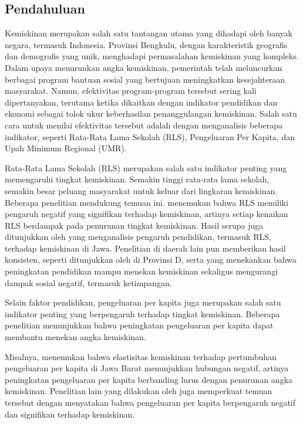 \documentclass[12pt,a4paper]{article}
\begin{document}
\begin{multicols}{2}
\section{Pendahuluan}

Kemiskinan merupakan salah satu tantangan utama yang dihadapi oleh banyak negara, termasuk Indonesia. Provinsi Bengkulu, dengan karakteristik geografis dan demografis yang unik, menghadapi permasalahan kemiskinan yang kompleks. Dalam upaya menurunkan angka kemiskinan, pemerintah telah meluncurkan berbagai program bantuan sosial yang bertujuan meningkatkan kesejahteraan masyarakat. Namun, efektivitas program-program tersebut sering kali dipertanyakan, terutama ketika dikaitkan dengan indikator pendidikan dan ekonomi sebagai tolok ukur keberhasilan penanggulangan kemiskinan. Salah satu cara untuk menilai efektivitas tersebut adalah dengan menganalisis beberapa indikator, seperti Rata-Rata Lama Sekolah (RLS), Pengeluaran Per Kapita, dan Upah Minimum Regional (UMR).



Rata-Rata Lama Sekolah (RLS) merupakan salah satu indikator penting yang memengaruhi tingkat kemiskinan. Semakin tinggi rata-rata lama sekolah, semakin besar peluang masyarakat untuk keluar dari lingkaran kemiskinan. Beberapa penelitian mendukung temuan ini. \cite{pradipta2020pengaruh} menemukan bahwa RLS memiliki pengaruh negatif yang signifikan terhadap kemiskinan, artinya setiap kenaikan RLS berdampak pada penurunan tingkat kemiskinan. Hasil serupa juga ditunjukkan oleh \cite{permatasari2024analisis} yang menganalisis pengaruh pendidikan, termasuk RLS, terhadap kemiskinan di Jawa. Penelitian di daerah lain pun memberikan hasil konsisten, seperti ditunjukkan oleh \cite{samudra2023pengaruh} di Provinsi D, serta \cite{supriyadi2024ketimpangn} yang menekankan bahwa peningkatan pendidikan mampu menekan kemiskinan sekaligus mengurangi dampak sosial negatif, termasuk ketimpangan.


Selain faktor pendidikan, pengeluaran per kapita juga merupakan salah satu indikator penting yang berpengaruh terhadap tingkat kemiskinan. Beberapa penelitian menunjukkan bahwa peningkatan pengeluaran per kapita dapat membantu menekan angka kemiskinan. 

Misalnya, \cite{muttaqin2025elastisitas} menemukan bahwa elastisitas kemiskinan terhadap pertumbuhan pengeluaran per kapita di Jawa Barat menunjukkan hubungan negatif, artinya peningkatan pengeluaran per kapita berbanding lurus dengan penurunan angka kemiskinan. Penelitian lain yang dilakukan oleh \cite{siregar2023analisis} juga memperkuat temuan tersebut dengan menyatakan bahwa pengeluaran per kapita berpengaruh negatif dan signifikan terhadap kemiskinan. 


\end{multicols}
\end{document}
